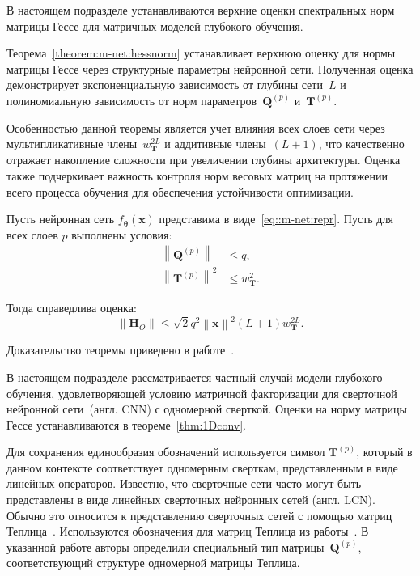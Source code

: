 В настоящем подразделе устанавливаются верхние оценки спектральных норм матрицы Гессе для матричных моделей глубокого обучения.

Теорема~\ref{theorem:m-net:hessnorm} устанавливает верхнюю оценку для нормы матрицы Гессе через структурные параметры нейронной сети. Полученная оценка демонстрирует экспоненциальную зависимость от глубины сети~$L$ и полиномиальную зависимость от норм параметров~$\mathbf{Q}^{(p)}$ и~$\mathbf{T}^{(p)}$.

Особенностью данной теоремы является учет влияния всех слоев сети через мультипликативные члены~$w_{\mathbf{T}}^{2L}$ и аддитивные члены~$(L+1)$, что качественно отражает накопление сложности при увеличении глубины архитектуры. Оценка также подчеркивает важность контроля норм весовых матриц на протяжении всего процесса обучения для обеспечения устойчивости оптимизации.

\begin{theorem}\label{theorem:m-net:hessnorm}
    Пусть нейронная сеть $f_{\boldsymbol{\theta}}(\mathbf{x})$ представима в виде~\eqref{eq::m-net:repr}.
    Пусть для всех слоев $p$ выполнены условия:
    \begin{align}
        \left\|\mathbf{Q}^{(p)}\right\| &\leqslant q, \\
        \left\|\mathbf{T}^{(p)}\right\|^2 &\leqslant w_{\mathbf{T}}^2.
    \end{align}
    
    Тогда справедлива оценка:
    \[
        \left\|\mathbf{H}_O\right\| \leqslant \sqrt{2}q^2\left\|\mathbf{x}\right\|^2(L+1)w_{\mathbf{T}}^{2L}.
    \]
\end{theorem}
Доказательство теоремы приведено в работе~\cite{grabovoi2024convnets743111032}.

В настоящем подразделе рассматривается частный случай модели глубокого обучения, удовлетворяющей условию матричной факторизации для сверточной нейронной сети~(англ. CNN) с одномерной сверткой. Оценки на норму матрицы Гессе устанавливаются в теореме~\ref{thm:1Dconv}.

Для сохранения единообразия обозначений используется символ $\mathbf{T}^{(p)}$, который в данном контексте соответствует одномерным сверткам, представленным в виде линейных операторов. Известно, что сверточные сети часто могут быть представлены в виде линейных сверточных нейронных сетей (англ. LCN). Обычно это относится к представлению сверточных сетей с помощью матриц Теплица~\cite{kohn2022geometrylinearconvolutionalnetworks, qin2023toeplitzneuralnetworksequence}. Используются обозначения для матриц Теплица из работы~\cite{singh2023hessianperspectivenatureconvolutional}. В указанной работе авторы определили специальный тип матрицы~$\mathbf{Q}^{(p)}$, соответствующий структуре одномерной матрицы Теплица.

